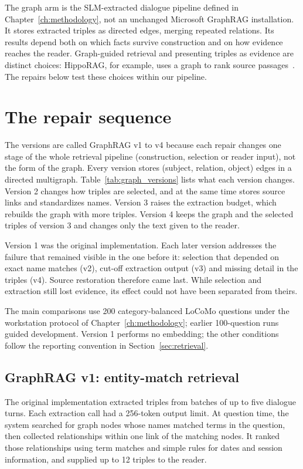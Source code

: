 The graph arm is the SLM-extracted dialogue pipeline defined in Chapter~\ref{ch:methodology},
not an unchanged Microsoft GraphRAG installation. It stores extracted triples as directed
edges, merging repeated relations. Its results depend both on which facts survive
construction and on how evidence reaches the reader. Graph-guided retrieval and presenting
triples as evidence are distinct choices: HippoRAG, for example, uses a graph to rank
source passages~\citep{hipporag2024}. The repairs below test these choices within our pipeline.

\section{The repair sequence}
\label{sec:ch6_ladder}

The versions are called GraphRAG v1 to v4 because each repair changes one stage of the whole
retrieval pipeline (construction, selection or reader input), not the form of the graph. Every
version stores (subject, relation, object) edges in a directed multigraph. Table~\ref{tab:graph_versions} lists what each version changes. Version 2 changes how
triples are selected, and at the same time stores source links and standardizes names. Version 3
raises the extraction budget, which rebuilds the graph with more triples. Version 4 keeps the graph
and the selected triples of version 3 and changes only the text given to the reader.

Version 1 was the original implementation. Each later version addresses the failure that remained
visible in the one before it: selection that depended on exact name matches (v2), cut-off extraction
output (v3) and missing detail in the triples (v4). Source restoration therefore came last. While
selection and extraction still lost evidence, its effect could not have been separated from theirs.

The main comparisons use 200 category-balanced LoCoMo questions under the workstation
protocol of Chapter~\ref{ch:methodology}; earlier 100-question runs guided development.
Version 1 performs no embedding; the other conditions follow the reporting convention
in Section~\ref{sec:retrieval}.

\subsection{GraphRAG v1: entity-match retrieval}

The original implementation extracted triples from batches of up to five dialogue turns. Each
extraction call had a 256-token output limit. At question time, the system searched for graph
nodes whose names matched terms in the question, then collected relationships within one link
of the matching nodes. It ranked those relationships using term matches and simple rules for
dates and session information, and supplied up to 12 triples to the reader.

